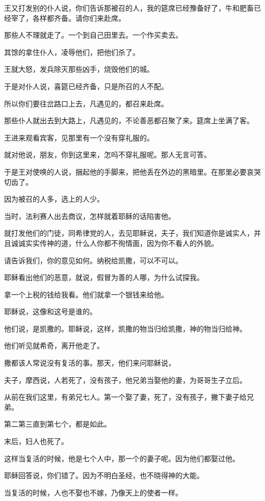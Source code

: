 \documentclass[12pt,oneside]{book}
\begin{document}
王又打发别的仆人说，你们告诉那被召的人，我的筵席已经豫备好了，牛和肥畜已经宰了，各样都齐备。请你们来赴席。

那些人不理就走了。一个到自己田里去。一个作买卖去。

其馀的拿住仆人，凌辱他们，把他们杀了。

王就大怒，发兵除灭那些凶手，烧毁他们的城。

于是对仆人说，喜筵已经齐备，只是所召的人不配。

所以你们要往岔路口上去，凡遇见的，都召来赴席。

那些仆人就出去到大路上，凡遇见的，不论善恶都召聚了来。筵席上坐满了客。

王进来观看宾客，见那里有一个没有穿礼服的。

就对他说，朋友，你到这里来，怎吗不穿礼服呢。那人无言可答。

于是王对使唤的人说，捆起他的手脚来，把他丢在外边的黑暗里。在那里必要哀哭切齿了。

因为被召的人多，选上的人少。

当时，法利赛人出去商议，怎样就着耶稣的话陷害他。

就打发他们的门徒，同希律党的人，去见耶稣说，夫子，我们知道你是诚实人，并且诚诚实实传神的道，什么人你都不徇情面，因为你不看人的外貌。

请告诉我们，你的意见如何。纳税给凯撒，可以不可以。

耶稣看出他们的恶意，就说，假冒为善的人哪，为什么试探我。

拿一个上税的钱给我看。他们就拿一个银钱来给他。

耶稣说，这像和这号是谁的。

他们说，是凯撒的。耶稣说，这样，凯撒的物当归给凯撒，神的物当归给神。

他们听见就希奇，离开他走了。

撒都该人常说没有复活的事。那天，他们来问耶稣说，

夫子，摩西说，人若死了，没有孩子，他兄弟当娶他的妻，为哥哥生子立后。

从前在我们这里，有弟兄七人。第一个娶了妻，死了，没有孩子，撇下妻子给兄弟。

第二第三直到第七个，都是如此。

末后，妇人也死了。

这样当复活的时候，他是七个人中，那一个的妻子呢。因为他们都娶过他。

耶稣回答说，你们错了。因为不明白圣经，也不晓得神的大能。

当复活的时候，人也不娶也不嫁，乃像天上的使者一样。
\end{document}
